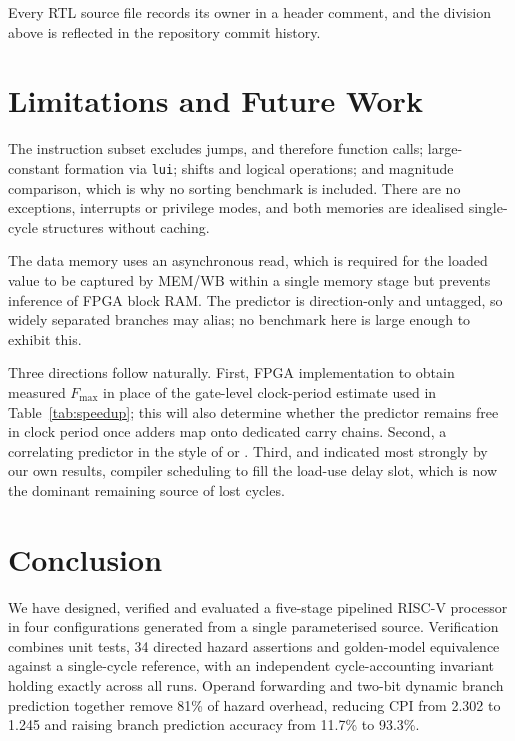\documentclass[conference]{IEEEtran}
\begin{document}
Every RTL source file records its owner in a header comment, and the
division above is reflected in the repository commit history.

\section{Limitations and Future Work}

The instruction subset excludes jumps, and therefore function calls;
large-constant formation via \texttt{lui}; shifts and logical operations;
and magnitude comparison, which is why no sorting benchmark is included.
There are no exceptions, interrupts or privilege modes, and both memories
are idealised single-cycle structures without caching.

The data memory uses an asynchronous read, which is required for the
loaded value to be captured by MEM/WB within a single memory stage but
prevents inference of FPGA block RAM. The predictor is direction-only and
untagged, so widely separated branches may alias; no benchmark here is
large enough to exhibit this.

Three directions follow naturally. First, FPGA implementation to obtain
measured $F_{\max}$ in place of the gate-level clock-period estimate used
in Table~\ref{tab:speedup}; this will also determine whether the predictor
remains free in clock period once adders map onto dedicated carry chains.
Second, a correlating predictor in the style of \cite{yehpatt1991} or
\cite{mcfarling1993}. Third, and indicated most strongly by our own
results, compiler scheduling to fill the load-use delay slot, which is now
the dominant remaining source of lost cycles.

\section{Conclusion}

We have designed, verified and evaluated a five-stage pipelined RISC-V
processor in four configurations generated from a single parameterised
source. Verification combines unit tests, 34 directed hazard assertions and
golden-model equivalence against a single-cycle reference, with an
independent cycle-accounting invariant holding exactly across all runs.
Operand forwarding and two-bit dynamic branch prediction together remove
81\% of hazard overhead, reducing CPI from 2.302 to 1.245 and raising
branch prediction accuracy from 11.7\% to 93.3\%.
\end{document}
